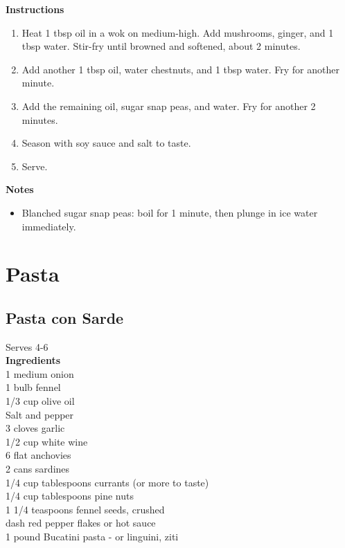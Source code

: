 \documentclass{article}
\numberwithin{figure}{section}
\numberwithin{equation}{section}
\begin{document}
{\bf Instructions}
\begin{enumerate}
\item Heat 1 tbsp oil in a wok on medium-high. Add mushrooms, ginger, and 1 tbsp water. Stir-fry until browned and softened, about 2 minutes.
\item Add another 1 tbsp oil, water chestnuts, and 1 tbsp water. Fry for another minute.
\item Add the remaining oil, sugar snap peas, and water. Fry for another 2 minutes.
\item Season with soy sauce and salt to taste.
\item Serve.
\end{enumerate}

{\bf Notes}
\begin{itemize}
\item Blanched sugar snap peas: boil for 1 minute, then plunge in ice water immediately.
\end{itemize}


\pagebreak
\section{Pasta}

\pagebreak
\subsection{Pasta con Sarde}
Serves 4-6\\

{\bf Ingredients}\\
1 medium onion\\
1 bulb fennel\\
1/3 cup olive oil\\
Salt and pepper\\
3 cloves garlic\\
1/2 cup white wine\\
6 flat anchovies\\
2 cans sardines\\
1/4 cup tablespoons currants (or more to taste)\\
1/4 cup tablespoons pine nuts\\
1 1/4 teaspoons fennel seeds, crushed\\
dash red pepper flakes or hot sauce\\
1 pound Bucatini pasta - or linguini, ziti\\
\end{document}
